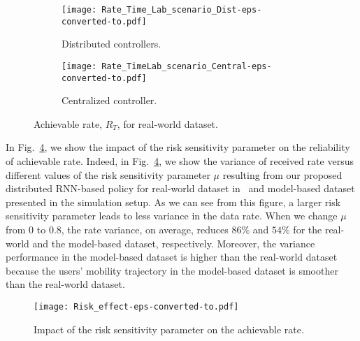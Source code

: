 \documentclass[conference]{IEEEtran}
\begin{document}
\begin{figure}[ht]
\begin{subfigure}{.5\textwidth}
  \centering
  \texttt{[image: Rate\_Time\_Lab\_scenario\_Dist-eps-converted-to.pdf]}
  \caption{Distributed controllers.}
  \label{Rate_Time_Lab_scenario_Dist}
\end{subfigure}
\begin{subfigure}{.5\textwidth}
  \centering
 \texttt{[image: Rate\_TimeLab\_scenario\_Central-eps-converted-to.pdf]}
  \caption{Centralized controller.}
  \label{Rate_TimeLab_scenario_Central}
\end{subfigure}
\caption{Achievable rate, $R_T$, for real-world dataset.}\label{Rate_Time_Lab}
\vspace{-0.1cm}
\end{figure}

In Fig.~\ref{Risk_effect}, we show the impact of the risk sensitivity parameter on the reliability of achievable rate. Indeed, in Fig.~\ref{Risk_effect}, we show the variance of received rate versus different values of the risk sensitivity parameter $\mu$ resulting from our proposed distributed RNN-based policy for real-world dataset in~\cite{dataset} and model-based dataset presented in the simulation setup. As we can see from this figure, a larger risk sensitivity parameter leads to less variance in the data rate. When we change $\mu$ from $0$ to $0.8$, the rate variance, on average, reduces $86\%$ and $54\%$ for the real-world and the model-based dataset, respectively. Moreover, the variance performance in the model-based dataset is higher than the real-world dataset because the users’ mobility trajectory in the model-based dataset is smoother than the real-world dataset.
\begin{figure}[t!]
  \centering
  \texttt{[image: Risk\_effect-eps-converted-to.pdf]}
  \caption{Impact of the risk sensitivity parameter on the achievable rate.} \vspace{-0.4cm}
  \label{Risk_effect}
  \vspace{-0.1cm}
\end{figure}
\end{document}
